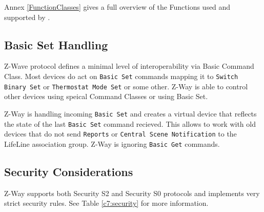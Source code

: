 {Annex \ref{FunctionClasses} gives a full overview of the Functions used and supported by \zway .

\subsection{Basic Set Handling}

Z-Wave protocol defines a minimal level of interoperability via Basic
Command Class. Most devices do act on \texttt{Basic Set} commands mapping it
to \texttt{Switch Binary Set} or \texttt{Thermostat Mode Set} or some other.
Z-Way is able to control other devices using speical Command Classes or
using Basic Set.

Z-Way is handling incoming \texttt{Basic Set} and creates a virtual device that
reflects the state of the last \texttt{Basic Set} command recieved. This
allows to work with old devices that do not send \texttt{Reports} or
\texttt{Central Scene Notification} to the LifeLine association group. Z-Way is
ignoring \texttt{Basic Get} commands.

\subsection{Security Considerations}

Z-Way supports both Security S2 and Security S0 protocols and implements
very strict security rules. See Table \ref{c7:security} for more
information.

}
